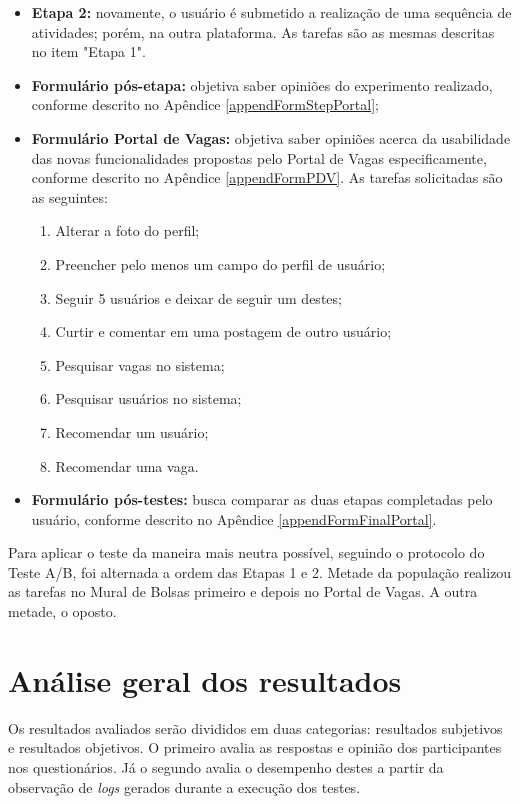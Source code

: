 \begin{itemize}
    \item \textbf{Etapa 2:} novamente, o usuário é submetido a realização de uma sequência de atividades; porém, na outra plataforma. As tarefas são as mesmas descritas no item "Etapa 1".
        
    \item \textbf{Formulário pós-etapa:} objetiva saber opiniões do experimento realizado, conforme descrito no Apêndice \ref{appendFormStepPortal};
    
    \item \textbf{Formulário Portal de Vagas:} objetiva saber opiniões acerca da usabilidade das novas funcionalidades propostas pelo Portal de Vagas especificamente, conforme descrito no Apêndice \ref{appendFormPDV}. As tarefas solicitadas são as seguintes:
        \begin{enumerate}
            \item Alterar a foto do perfil;
            \item Preencher pelo menos um campo do perfil de usuário;
            \item Seguir 5 usuários e deixar de seguir um destes;
            \item Curtir e comentar em uma postagem de outro usuário;
            \item Pesquisar vagas no sistema;
            \item Pesquisar usuários no sistema;
            \item Recomendar um usuário;
            \item Recomendar uma vaga.
        \end{enumerate}
    
    \item \textbf{Formulário pós-testes:} busca comparar as duas etapas completadas pelo usuário, conforme descrito no Apêndice \ref{appendFormFinalPortal}.
\end{itemize}

Para aplicar o teste da maneira mais neutra possível, seguindo o protocolo do Teste A/B, foi alternada a ordem das Etapas 1 e 2. Metade da população realizou as tarefas no Mural de Bolsas primeiro e depois no Portal de Vagas. A outra metade, o oposto.


\section{Análise geral dos resultados}
\label{avaliacaoAnalise}

Os resultados avaliados serão divididos em duas categorias: resultados subjetivos e resultados objetivos. O primeiro avalia as respostas e opinião dos participantes nos questionários. Já o segundo avalia o desempenho destes a partir da observação de \textit{logs} gerados durante a execução dos testes.


